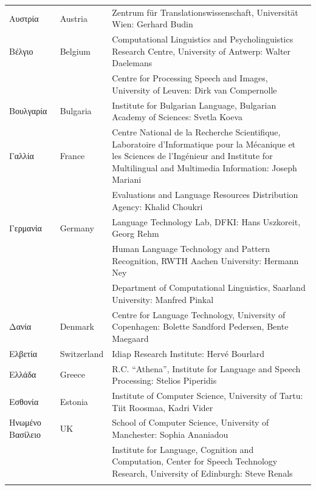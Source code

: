 \small
\begin{longtable}{@{}llp{113mm}@{}}
  Αυστρία & \textcolor{grey1}{Austria} & Zentrum für Translationswissenschaft, Universität Wien: Gerhard Budin\\ \addlinespace 
  Βέλγιο & \textcolor{grey1}{Belgium} & Computational Linguistics and Psycholinguistics Research Centre, University of Antwerp: Walter Daelemans\\ \addlinespace
  & & Centre for Processing Speech and Images, University of Leuven: Dirk van Compernolle \\ \addlinespace
  Βουλγαρία & \textcolor{grey1}{Bulgaria} & Institute for Bulgarian Language, Bulgarian Academy of Sciences: Svetla Koeva \\ \addlinespace
  Γαλλία & \textcolor{grey1}{France} & Centre National de la Recherche Scientifique, Laboratoire d'Informatique pour la Mécanique et les Sciences de l'Ingénieur and Institute for Multilingual and Multimedia Information: Joseph Mariani \\ \addlinespace
  & & Evaluations and Language Resources Distribution Agency: Khalid Choukri\\ \addlinespace 
  Γερμανία & \textcolor{grey1}{Germany} & Language Technology Lab, DFKI: Hans Uszkoreit, Georg Rehm\\ \addlinespace
  & & Human Language Technology and Pattern Recognition, RWTH Aachen University: Hermann Ney \\ \addlinespace
  & & Department of Computational Linguistics, Saarland University: Manfred Pinkal\\ \addlinespace Δανία &  \textcolor{grey1}{Denmark} & Centre for Language Technology, University of Copenhagen: \newline Bolette Sandford Pedersen, Bente Maegaard\\ \addlinespace
  Ελβετία & \textcolor{grey1}{Switzerland} & Idiap Research Institute: Hervé Bourlard \\ \addlinespace 
  Ελλάδα & \textcolor{grey1}{Greece} & R.C. “Athena”, Institute for Language and Speech Processing: Stelios Piperidis\\ \addlinespace
  Εσθονία & \textcolor{grey1}{Estonia} & Institute of Computer Science, University of Tartu: Tiit Roosmaa, Kadri Vider\\ \addlinespace
  Ηνωμένο Βασίλειο & \textcolor{grey1}{UK} & School of Computer Science, University of Manchester: Sophia Ananiadou \\ \addlinespace 
  & & Institute for Language, Cognition and Computation, Center for Speech Technology Research, University of Edinburgh: Steve Renals \\ \addlinespace 

\end{longtable}
